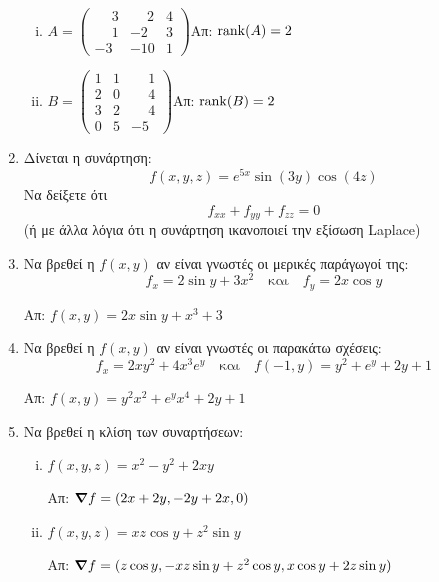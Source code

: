 \documentclass[a4paper,12pt]{article}
\begin{document}
\begin{enumerate}
\begin{enumerate}[i)]

\item $A=\begin{pmatrix}
\phantom{-}3 & \phantom{-}2 & 4 \\
\phantom{-}1 & -2 & 3 \\
-3 & -10 & 1 
\end{pmatrix}$\hfill Απ: $\rank(A)=2$

\item $B=\begin{pmatrix}
1 & 1 & \phantom{-}1 \\
2 & 0 & \phantom{-}4 \\
3 & 2 & \phantom{-}4 \\
0 & 5 & -5
\end{pmatrix}$\hfill Απ: $\rank(B)=2$

\end{enumerate}

\item Δίνεται η συνάρτηση: \[f(x,y,z)=e^{5x}\sin(3y)\cos(4z)\] Να δείξετε ότι \[f_{xx}+f_{yy}+f_{zz}=0\] (ή με άλλα λόγια ότι η συνάρτηση ικανοποιεί την εξίσωση \textlatin{Laplace})

\item Να βρεθεί η $f(x,y)$ αν είναι γνωστές οι μερικές παράγωγοί της:
\[
f_x=2\sin y + 3x^2 \quad \text{και} \quad f_y=2x\cos y 
\]

\hfill Απ: $f(x,y)=2x\sin y + x^3 + 3$

\item Να βρεθεί η $f(x,y)$ αν είναι γνωστές οι παρακάτω σχέσεις: 
\[
f_x=2xy^2+4x^3e^y \quad \text{και} \quad f(-1,y)=y^2+e^y+2y+1
\]

\hfill Απ: $f(x,y)= y^2x^2 +e^yx^4+2y+1$

\item Να βρεθεί η κλίση των συναρτήσεων:

\begin{enumerate}[i)]

\item $f(x,y,z)=x^2-y^2+2xy$ 

\hfill Απ: $\grad f = (2x+2y,-2y+2x,0)$

\item $f(x,y,z)=xz\cos y+z^2\sin y$ 

\hfill Απ: $\grad f=(z\cos y, -xz\sin y + z^2\cos y, x\cos y + 2z\sin y)$

\end{enumerate} 


\end{enumerate}
\end{document}
